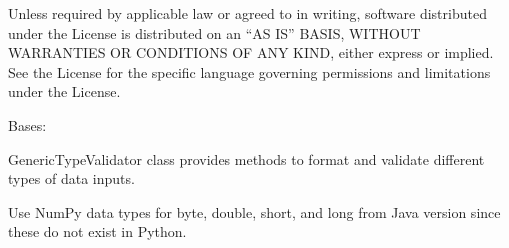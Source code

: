 \documentclass[letterpaper,10pt,english]{sphinxmanual}
\begin{document}
\sphinxAtStartPar
{}

\sphinxAtStartPar
Unless required by applicable law or agreed to in writing, software
distributed under the License is distributed on an “AS IS” BASIS,
WITHOUT WARRANTIES OR CONDITIONS OF ANY KIND, either express or implied.
See the License for the specific language governing permissions and
limitations under the License.

\begin{fulllineitems}
\label{\detokenize{apache_commons_validator_python:apache_commons_validator_python.generic_type_validator_new.GenericTypeValidator}}
\pysigstartsignatures
{}
\pysigstopsignatures
\sphinxAtStartPar
Bases: 

\sphinxAtStartPar
GenericTypeValidator class provides methods to format and validate different
types of data inputs.

\sphinxAtStartPar
Use NumPy data types for byte, double, short, and long from Java version since these
do not exist in Python.

\begin{fulllineitems}
\label{\detokenize{apache_commons_validator_python:apache_commons_validator_python.generic_type_validator_new.GenericTypeValidator.cloneable}}
\pysigstartsignatures
{}
\pysigstopsignatures
\end{fulllineitems}



\end{fulllineitems}
\end{document}

